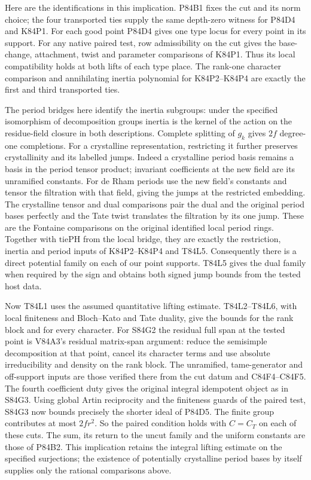 Here are the identifications in this implication. P84B1 fixes the
cut and its norm choice; the four transported ties supply the same
depth-zero witness for P84D4 and K84P1. For each good point
P84D4 gives one type locus for every point in its support.
For any native paired test, row admissibility on the cut gives
the base-change, attachment, twist and parameter comparisons of
K84P1. Thus its local compatibility holds at both lifts of each
type place. The rank-one character comparison and annihilating
inertia polynomial for K84P2--K84P4 are exactly the first and
third transported ties.

The period bridges here identify the inertia subgroups: under the
specified isomorphism of decomposition groups inertia is the kernel
of the action on the residue-field closure in both descriptions.
Complete splitting of $g_k$ gives $2f$ degree-one completions.
For a crystalline representation, restricting it further preserves
crystallinity and its labelled jumps. Indeed a crystalline period
basis remains a basis in the period tensor product; invariant
coefficients at the new field are its unramified constants.
For de Rham periods use the new field's constants and tensor the
filtration with that field, giving the jumps at the restricted
embedding. The crystalline tensor and dual comparisons pair the
dual and the original period bases perfectly and the Tate twist
translates the filtration by its one jump. These are the
Fontaine comparisons on the original identified local period
rings. Together with $\mathrm{tiePH}$ from the local bridge,
they are exactly the restriction, inertia and period inputs of
K84P2--K84P4 and T84L5. Consequently there is a direct potential
family on each of our point supports. T84L5 gives the dual
family when required by the sign and obtains both signed jump
bounds from the tested host data.

Now T84L1 uses the assumed quantitative lifting estimate.
T84L2--T84L6, with local finiteness and Bloch--Kato and Tate
duality, give the bounds for the rank block and for every
character. For S84G2 the residual full span at the tested point
is V84A3's residual matrix-span argument: reduce the semisimple
decomposition at that point, cancel its character terms and use
absolute irreducibility and density on the rank block. The
unramified, tame-generator and off-support inputs are those
verified there from the cut datum and C84F4--C84F5. The fourth
coefficient duty gives the original integral idempotent object
as in S84G3. Using global Artin reciprocity and the finiteness
guards of the paired test, S84G3 now bounds precisely the shorter
ideal of P84D5. The finite group contributes at most $2fr^2$.
So the paired condition holds with $C=C_T$ on each of these
cuts. The sum, its return to the uncut family and the uniform
constants are those of P84B2. This implication retains the
integral lifting estimate on the specified surjections; the
existence of potentially crystalline period bases by itself
supplies only the rational comparisons above.
